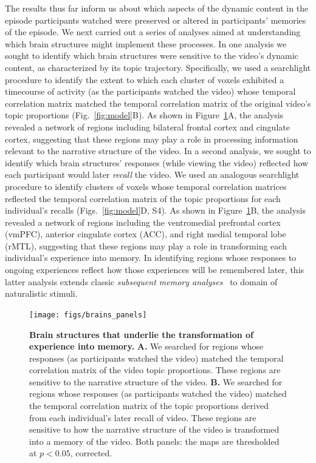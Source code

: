 \documentclass{article}
\newcommand{\corrmats}{S4}
\begin{document}
The results thus far inform us about which aspects of the dynamic content in the episode participants watched were preserved or altered in participants' memories of the episode.  We next carried out a series of analyses aimed at understanding which brain structures might implement these processes.  In one analysis we sought to identify which brain structures were sensitive to the video's dynamic content, as characterized by its topic trajectory.  Specifically, we used a searchlight procedure to identify the extent to which each cluster of voxels exhibited a timecourse of activity (as the participants watched the video) whose temporal correlation matrix matched the temporal correlation matrix of the original video's topic proportions (Fig.~\ref{fig:model}B).  As shown in Figure~\ref{fig:brainz}A, the analysis revealed a network of regions including bilateral frontal cortex and cingulate cortex, suggesting that these regions may play a role in processing information relevant to the narrative structure of the video.  In a second analysis, we sought to identify which brain structures' responses (while viewing the video) reflected how each participant would later \textit{recall} the video.  We used an analogous searchlight procedure to identify clusters of voxels whose temporal correlation matrices reflected the temporal correlation matrix of the topic proportions for each individual's recalls (Figs.~\ref{fig:model}D, \corrmats).  As shown in Figure~\ref{fig:brainz}B, the analysis revealed a network of regions including the ventromedial prefrontal cortex (vmPFC), anterior cingulate cortex (ACC), and right medial temporal lobe (rMTL), suggesting that these regions may play a role in transforming each individual's experience into memory.  In identifying regions whose responses to ongoing experiences reflect how those experiences will be remembered later, this latter analysis extends classic \textit{subsequent memory analyses}~\citep[e.g.,][]{PallWagn02} to domain of naturalistic stimuli.

\begin{figure}[tp]
\centering
\texttt{[image: figs/brains\_panels]}
\caption{\small \textbf{Brain structures that underlie the transformation of experience into memory.} \textbf{A.} We searched for regions whose responses (as participants watched the video) matched the temporal correlation matrix of the video topic proportions.  These regions are sensitive to the narrative structure of the video.  \textbf{B.} We searched for regions whose responses (as participants watched the video) matched the temporal correlation matrix of the topic proportions derived from each individual's later recall of video.  These regions are sensitive to how the narrative structure of the video is transformed into a memory of the video.  Both panels: the maps are thresholded at $p < 0.05$, corrected.}
\label{fig:brainz}
\end{figure}
\end{document}
